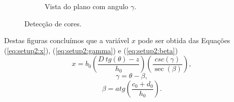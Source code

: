 \documentclass[a4paper, 12pt]{article}
\begin{document}
\begin{figure}[!h]
\begin{subfigure}[b]{0.475\textwidth}
         \caption{Vista do plano com angulo $\gamma$.}
         \label{fig:blocos2:plano}
     \end{subfigure}
\caption{Detecção de cores.}
\label{fig:blocos2}
\end{figure}
Destas figuras concluímos que a variável $x$ pode ser obtida das Equações (\ref{eq:setup2:x}), 
 (\ref{eq:setup2:gamma}) e (\ref{eq:setup2:beta})
\begin{equation}\label{eq:setup2:x}
x=b_0\left(\frac{D~tg(\theta)-z}{h_0}\right)\left(\frac{csc\left({\gamma}\right) }{\sec\left(\beta\right)}\right),
\end{equation}
\begin{equation}\label{eq:setup2:gamma}
\gamma=\theta-\beta,
\end{equation}
\begin{equation}\label{eq:setup2:beta}
\beta=atg\left(\frac{c_0+d_0}{h_0}\right).
\end{equation}
\end{document}
